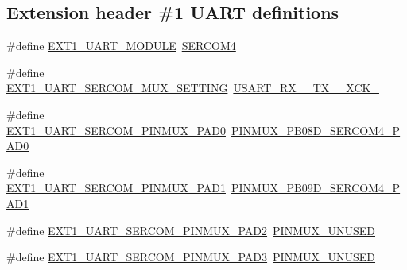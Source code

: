 \subsection*{Extension header \#1 U\+A\+RT definitions}
\begin{DoxyCompactItemize}
\item 
\#define \mbox{\hyperlink{group__samd21__xplained__pro__features__group_ga0926bf9254087738e85b09e734c4e7ca}{E\+X\+T1\+\_\+\+U\+A\+R\+T\+\_\+\+M\+O\+D\+U\+LE}}~\mbox{\hyperlink{group___s_a_m_d21_j18_a__base_gad48343faa88820b8f552aa1eaf66f00a}{S\+E\+R\+C\+O\+M4}}
\item 
\#define \mbox{\hyperlink{group__samd21__xplained__pro__features__group_ga1a806a0ca2b2d26a4e884ad7c2d68b4d}{E\+X\+T1\+\_\+\+U\+A\+R\+T\+\_\+\+S\+E\+R\+C\+O\+M\+\_\+\+M\+U\+X\+\_\+\+S\+E\+T\+T\+I\+NG}}~\mbox{\hyperlink{group__asfdoc__sam0__sercom__usart__group_gga87bbdb9f7edb3f1866aeb498bf7c9077ac937b1e1063cc3d094c4534c022af703}{U\+S\+A\+R\+T\+\_\+\+R\+X\+\_\+\_\+\+T\+X\+\_\+\_\+\+X\+C\+K\+\_}}
\item 
\#define \mbox{\hyperlink{group__samd21__xplained__pro__features__group_ga55b432da33f107edf738cce079341010}{E\+X\+T1\+\_\+\+U\+A\+R\+T\+\_\+\+S\+E\+R\+C\+O\+M\+\_\+\+P\+I\+N\+M\+U\+X\+\_\+\+P\+A\+D0}}~\mbox{\hyperlink{pio_2samd21j18a_8h_a81d7f6a3bbb876480a5fcbc369019a8e}{P\+I\+N\+M\+U\+X\+\_\+\+P\+B08\+D\+\_\+\+S\+E\+R\+C\+O\+M4\+\_\+\+P\+A\+D0}}
\item 
\#define \mbox{\hyperlink{group__samd21__xplained__pro__features__group_gade2f210effcd07813848e0b7d8830258}{E\+X\+T1\+\_\+\+U\+A\+R\+T\+\_\+\+S\+E\+R\+C\+O\+M\+\_\+\+P\+I\+N\+M\+U\+X\+\_\+\+P\+A\+D1}}~\mbox{\hyperlink{pio_2samd21j18a_8h_aacee0dd5c58a1e999c4a73119ce6d465}{P\+I\+N\+M\+U\+X\+\_\+\+P\+B09\+D\+\_\+\+S\+E\+R\+C\+O\+M4\+\_\+\+P\+A\+D1}}
\item 
\#define \mbox{\hyperlink{group__samd21__xplained__pro__features__group_ga3a24abc55a0d5948eec737e92c04d15d}{E\+X\+T1\+\_\+\+U\+A\+R\+T\+\_\+\+S\+E\+R\+C\+O\+M\+\_\+\+P\+I\+N\+M\+U\+X\+\_\+\+P\+A\+D2}}~\mbox{\hyperlink{group__asfdoc__sam0__sercom__usart__group_gaffde9ff712058ef836127e1f3368889e}{P\+I\+N\+M\+U\+X\+\_\+\+U\+N\+U\+S\+ED}}
\item 
\#define \mbox{\hyperlink{group__samd21__xplained__pro__features__group_gab17cebde86abeb0d1389a41f0435ddb9}{E\+X\+T1\+\_\+\+U\+A\+R\+T\+\_\+\+S\+E\+R\+C\+O\+M\+\_\+\+P\+I\+N\+M\+U\+X\+\_\+\+P\+A\+D3}}~\mbox{\hyperlink{group__asfdoc__sam0__sercom__usart__group_gaffde9ff712058ef836127e1f3368889e}{P\+I\+N\+M\+U\+X\+\_\+\+U\+N\+U\+S\+ED}}

\end{DoxyCompactItemize}
